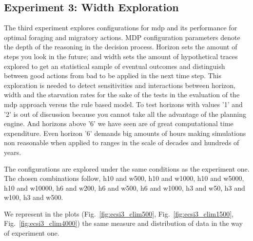 \documentclass[11pt,oneside,a4paper,openright]{report}
\begin{document}

\subsection{Experiment 3: Width Exploration}
\label{sec:expEcsi3}
The third experiment explores configurations for mdp and its performance for optimal foraging and migratory actions. MDP configuration parameters denote the depth of the reasoning in the decision process. 
Horizon sets the amount of steps you look in the future; and width sets the amount of hypothetical traces explored to get an statistical sample of eventual outcomes and distinguish between good actions from bad to be applied in the next time step. 
This exploration is needed  to detect sensitivities and interactions between horizon, width and the starvation rates for the sake of the tests in the evaluation of the mdp approach versus the rule based model. 
To test horizons with values '1' and '2' is out of discussion because you cannot take all the advantage of the planning engine. And horizons above '6' we have seen are of great computational time expenditure. Even horizon '6' demands big amounts of hours making simulations non reasonable when applied to ranges in the scale of decades and hundreds of years.

The configurations are explored under the same conditions as the experiment one. The chosen combinations follow, h10 and w500, h10 and w1000, h10 and w5000, h10 and w10000, h6 and w200, h6 and w500, h6 and w1000, h3 and w50, h3 and w100, h3 and w500.


We represent in the plots (Fig.~\ref{fig:ecsi3_clim500}, Fig.~\ref{fig:ecsi3_clim1500}, Fig.~\ref{fig:ecsi3_clim4000}) the same measure and distribution of data in the way of experiment one.
\end{document}
